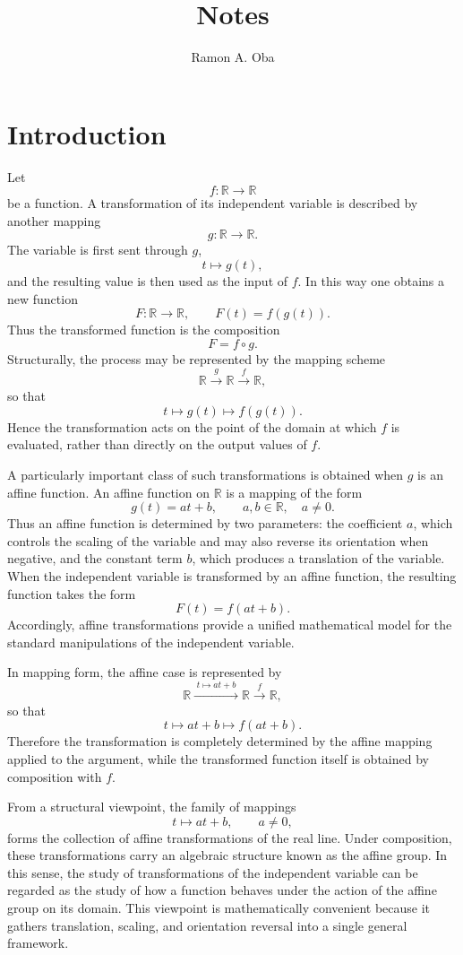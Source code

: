 \documentclass{article}
\begin{document}
	
	\title{Notes}
	\author{Ramon A. Oba}
	\date{}
	
	\maketitle
	\section*{Introduction}
	
	Let
	\[
	f:\mathbb{R}\to\mathbb{R}
	\]
	be a function. A transformation of its independent variable is described by another mapping
	\[
	g:\mathbb{R}\to\mathbb{R}.
	\]
	The variable is first sent through \(g\),
	\[
	t\mapsto g(t),
	\]
	and the resulting value is then used as the input of \(f\). In this way one obtains a new function
	\[
	F:\mathbb{R}\to\mathbb{R},\qquad F(t)=f(g(t)).
	\]
	Thus the transformed function is the composition
	\[
	F=f\circ g.
	\]
	Structurally, the process may be represented by the mapping scheme
	\[
	\mathbb{R}\xrightarrow{\;g\;}\mathbb{R}\xrightarrow{\;f\;}\mathbb{R},
	\]
	so that
	\[
	t\longmapsto g(t)\longmapsto f(g(t)).
	\]
	Hence the transformation acts on the point of the domain at which \(f\) is evaluated, rather than directly on the output values of \(f\).
	
	A particularly important class of such transformations is obtained when \(g\) is an affine function. An affine function on \(\mathbb{R}\) is a mapping of the form
	\[
	g(t)=at+b,\qquad a,b\in\mathbb{R},\quad a\neq 0.
	\]
	Thus an affine function is determined by two parameters: the coefficient \(a\), which controls the scaling of the variable and may also reverse its orientation when negative, and the constant term \(b\), which produces a translation of the variable. When the independent variable is transformed by an affine function, the resulting function takes the form
	\[
	F(t)=f(at+b).
	\]
	Accordingly, affine transformations provide a unified mathematical model for the standard manipulations of the independent variable.
	
	In mapping form, the affine case is represented by
	\[
	\mathbb{R}\xrightarrow{\;t\mapsto at+b\;}\mathbb{R}\xrightarrow{\;f\;}\mathbb{R},
	\]
	so that
	\[
	t\longmapsto at+b\longmapsto f(at+b).
	\]
	Therefore the transformation is completely determined by the affine mapping applied to the argument, while the transformed function itself is obtained by composition with \(f\).
	
	From a structural viewpoint, the family of mappings
	\[
	t\mapsto at+b,\qquad a\neq 0,
	\]
	forms the collection of affine transformations of the real line. Under composition, these transformations carry an algebraic structure known as the affine group. In this sense, the study of transformations of the independent variable can be regarded as the study of how a function behaves under the action of the affine group on its domain. This viewpoint is mathematically convenient because it gathers translation, scaling, and orientation reversal into a single general framework.
	
\end{document}
